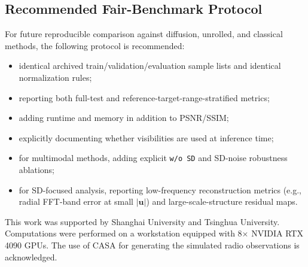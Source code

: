 \documentclass[twocolumn]{aastex631}
\begin{document}
\subsection{Recommended Fair-Benchmark Protocol}

For future reproducible comparison against diffusion, unrolled, and classical methods, the following protocol is recommended:
\begin{itemize}
	\item identical archived train/validation/evaluation sample lists and identical normalization rules;
	\item reporting both full-test and reference-target-range-stratified metrics;
	\item adding runtime and memory in addition to PSNR/SSIM;
	\item explicitly documenting whether visibilities are used at inference time;
	\item for multimodal methods, adding explicit \texttt{w/o SD} and SD-noise robustness ablations;
	\item for SD-focused analysis, reporting low-frequency reconstruction metrics (e.g., radial FFT-band error at small $|\mathbf{u}|$) and large-scale-structure residual maps.
\end{itemize}

\begin{acknowledgments}
	This work was supported by Shanghai University and Tsinghua University.
	Computations were performed on a workstation equipped with 8$\times$ NVIDIA RTX 4090 GPUs.
	The use of CASA for generating the simulated radio observations is acknowledged.
\end{acknowledgments}

\vspace{5mm}



\end{document}
